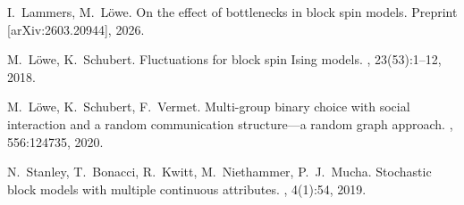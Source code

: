 \documentclass[11pt,oneside]{amsart}
\numberwithin{equation}{section}  %
\theoremstyle{plain}
\theoremstyle{remark}
\begin{document}
\begin{thebibliography}{}
I.~Lammers, M.~L\"owe.
\newblock On the effect of bottlenecks in block spin models. Preprint [arXiv:2603.20944], 2026.

M.~L\"owe, K.~Schubert.
\newblock Fluctuations for block spin Ising models.
, 23(53):1--12, 2018.

M.~L\"owe, K.~Schubert, F.~Vermet.
\newblock Multi-group binary choice with social interaction and a random    
communication structure---a random graph approach.
, 556:124735, 2020.

N.~Stanley, T.~Bonacci, R.~Kwitt, M.~Niethammer, P.~J.~Mucha. 
\newblock Stochastic block models with multiple continuous attributes.
, 4(1):54, 2019.

\end{thebibliography}
\end{document}
